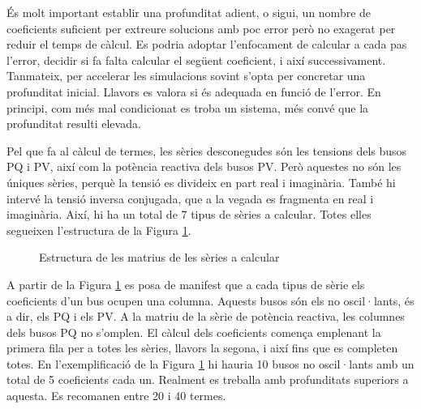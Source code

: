 És molt important establir una profunditat adient, o sigui, un nombre de coeficients suficient per extreure solucions amb poc error però no exagerat per reduir el temps de càlcul. Es podria adoptar l'enfocament de calcular a cada pas l'error, decidir si fa falta calcular el següent coeficient, i així successivament. Tanmateix, per accelerar les simulacions sovint s'opta per concretar una profunditat inicial. Llavors es valora si és adequada en funció de l'error. En principi, com més mal condicionat es troba un sistema, més convé que la profunditat resulti elevada. 

Pel que fa al càlcul de termes, les sèries desconegudes són les tensions dels busos PQ i PV, així com la potència reactiva dels busos PV. Però aquestes no són les úniques sèries, perquè la tensió es divideix en part real i imaginària. També hi intervé la tensió inversa conjugada, que a la vegada es fragmenta en real i imaginària. Així, hi ha un total de 7 tipus de sèries a calcular. Totes elles segueixen l'estructura de la Figura \ref{fig:prog2}.

\begin{figure}[!htb] \footnotesize
    \begin{center}
  \caption{Estructura de les matrius de les sèries a calcular}
  \label{fig:prog2}
\end{center}
\end{figure}

A partir de la Figura \ref{fig:prog2} es posa de manifest que a cada tipus de sèrie els coeficients d'un bus ocupen una columna. Aquests busos són els no oscil·lants, és a dir, els PQ i els PV. A la matriu de la sèrie de potència reactiva, les columnes dels busos PQ no s'omplen. El càlcul dels coeficients comença emplenant la primera fila per a totes les sèries, llavors la segona, i així fins que es completen totes. En l'exemplificació de la Figura \ref{fig:prog2} hi hauria 10 busos no oscil·lants amb un total de 5 coeficients cada un. Realment es treballa amb profunditats superiors a aquesta. Es recomanen entre 20 i 40 termes.

